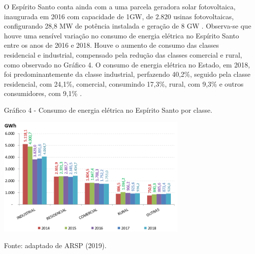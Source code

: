 \begin{onehalfspace}
\noindent O Espírito Santo conta ainda com a uma parcela geradora solar fotovoltaica, inaugurada em 2016 com capacidade de 1GW, de 2.820 usinas fotovoltaicas, configurando 28,8 MW de potência instalada e geração de 8 GW \cite{AgenciadeRegulacaodeServicosPublicosdoEspiritoSanto-ARSP2018}.\vspace{0.3cm} \newline
Observa-se que houve uma sensível variação no consumo de energia elétrica no Espírito Santo entre os anos de 2016 e 2018. Houve o aumento de consumo das classes residencial e industrial, compensado pela redução das classes comercial e rural, como observado no Gráfico 4. O consumo de energia elétrica no Estado, em 2018, foi predominantemente da classe industrial, perfazendo 40,2\%, seguido pela classe residencial, com 24,1\%, comercial, consumindo 17,3\%, rural, com 9,3\% e outros consumidores, com 9,1\% \cite{AgenciadeRegulacaodeServicosPublicosdoEspiritoSanto-ARSP2019}.
    
        \begin{graph}
            \par \small Gráfico 4 - Consumo de energia elétrica no Espírito Santo por classe.
            \begin{minipage}[ht]{1\textwidth}\centering
                \includegraphics[width=0.7\textwidth]{graphs/graph3_consumo_de_energia_eletrica_no_es_por_classe-arsp_2019.png}
            \end{minipage}
            \begin{flushleft}
                \par \small Fonte: adaptado de ARSP (2019).
            \end{flushleft}
        \end{graph}


\end{onehalfspace}
